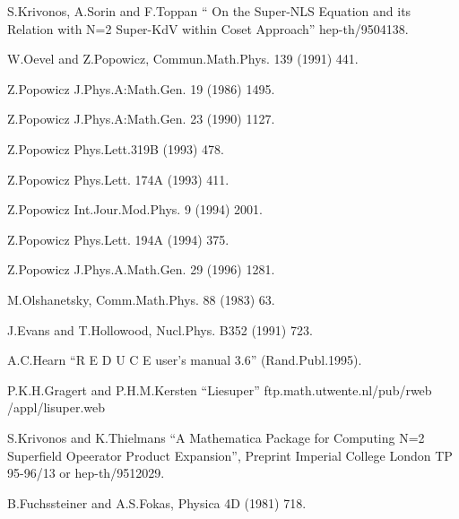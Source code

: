 \begin{thebibliography}{99}
\item{} S.Krivonos, A.Sorin and F.Toppan `` On the Super-NLS Equation and its
        Relation with N=2 Super-KdV within Coset Approach'' hep-th/9504138.

\item{} W.Oevel and Z.Popowicz, Commun.Math.Phys. 139 (1991) 441.

\item{} Z.Popowicz J.Phys.A:Math.Gen. 19 (1986) 1495.

\item{} Z.Popowicz J.Phys.A:Math.Gen. 23 (1990) 1127.

\item{} Z.Popowicz Phys.Lett.319B (1993) 478.

\item{} Z.Popowicz Phys.Lett. 174A (1993) 411.

\item{} Z.Popowicz Int.Jour.Mod.Phys. 9 (1994) 2001.

\item{} Z.Popowicz Phys.Lett. 194A (1994) 375.

\item{} Z.Popowicz J.Phys.A.Math.Gen. 29 (1996) 1281.

\item{} M.Olshanetsky, Comm.Math.Phys. 88 (1983) 63.

\item{} J.Evans and T.Hollowood, Nucl.Phys. B352 (1991) 723.

\item{} A.C.Hearn ``R E D U C E user's manual 3.6'' (Rand.Publ.1995).

\item{} P.K.H.Gragert and P.H.M.Kersten  ``Liesuper''  ftp.math.utwente.nl/pub/rweb /appl/lisuper.web

\item{} S.Krivonos and K.Thielmans ``A Mathematica Package for Computing N=2
    Superfield Opeerator Product Expansion'', Preprint Imperial College
    London TP  95-96/13 or hep-th/9512029.

\item{} B.Fuchssteiner and A.S.Fokas, Physica 4D (1981) 718.

\end{thebibliography}


